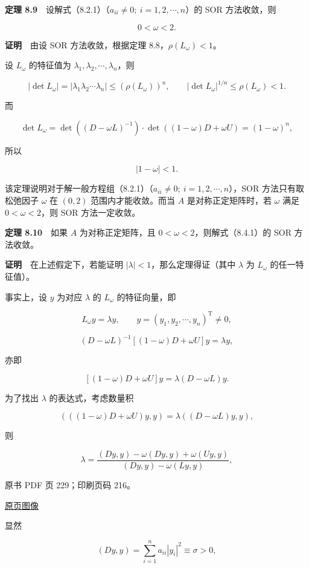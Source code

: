 \textbf{定理 8.9}　设解式（8.2.1）（\(a_{ii}\neq0;\ i=1,2,\cdots,n\)）的 SOR 方法收敛，则

\[
0<\omega<2.
\]

\textbf{证明}　由设 SOR 方法收敛，根据定理 8.8，\(\rho(L_\omega)<1\)。

设 \(L_\omega\) 的特征值为 \(\lambda_1,\lambda_2,\cdots,\lambda_n\)，则

\[
|\det L_\omega|=|\lambda_1\lambda_2\cdots\lambda_n|\leqslant(\rho(L_\omega))^n,\qquad
|\det L_\omega|^{1/n}\leqslant\rho(L_\omega)<1.
\]

而

\[
\det L_\omega=\det((D-\omega L)^{-1})\cdot\det((1-\omega)D+\omega U)=(1-\omega)^n,
\]

所以

\[
|1-\omega|<1.
\]

该定理说明对于解一般方程组（8.2.1）（\(a_{ii}\neq0;\ i=1,2,\cdots,n\)），SOR 方法只有取松弛因子 \(\omega\) 在 \((0,2)\) 范围内才能收敛。而当 \(A\) 是对称正定矩阵时，若 \(\omega\) 满足 \(0<\omega<2\)，则 SOR 方法一定收敛。

\textbf{定理 8.10}　如果 \(A\) 为对称正定矩阵，且 \(0<\omega<2\)，则解式（8.4.1）的 SOR 方法收敛。

\textbf{证明}　在上述假定下，若能证明 \(|\lambda|<1\)，那么定理得证（其中 \(\lambda\) 为 \(L_\omega\) 的任一特征值）。

事实上，设 \(y\) 为对应 \(\lambda\) 的 \(L_\omega\) 的特征向量，即

\[
L_\omega y=\lambda y,\qquad y=(y_1,y_2,\cdots,y_n)^{\mathrm T}\neq0,
\]

\[
(D-\omega L)^{-1}[(1-\omega)D+\omega U]y=\lambda y,
\]

亦即

\[
[(1-\omega)D+\omega U]y=\lambda(D-\omega L)y.
\]

为了找出 \(\lambda\) 的表达式，考虑数量积

\[
(((1-\omega)D+\omega U)y,y)=\lambda((D-\omega L)y,y),
\]

则

\[
\lambda=\frac{(Dy,y)-\omega(Dy,y)+\omega(Uy,y)}{(Dy,y)-\omega(Ly,y)},
\]

\clearpage

原书 PDF 页 229；印刷页码 216。

\href{source-images/pdf-229.jpeg}{原页图像}

显然

\[
(Dy,y)=\sum_{i=1}^n a_{ii}|y_i|^2\equiv\sigma>0,
\tag{8.4.9}
\]

